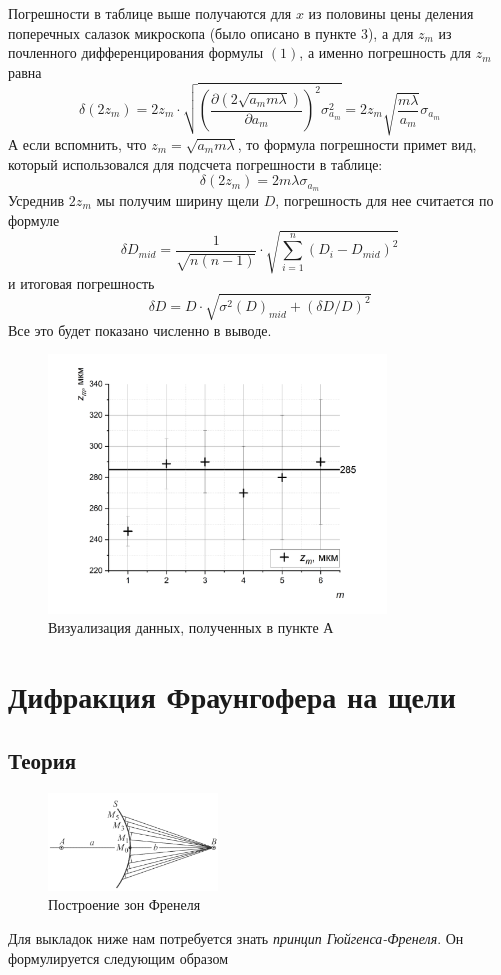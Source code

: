 \documentclass[a4paper, 12pt]{article}%
\begin{document}
\begin{enumerate}
Погрешности в таблице выше получаются для $x$ из половины цены деления поперечных салазок микроскопа (было описано в пункте 3), а для $z_m$ из почленного дифференцирования формулы $(1)$, а именно погрешность для $z_m$ равна 
\[ \delta(2 z_m) = 2	z_m \cdot \sqrt{\left(\dfrac{\partial \left( 2\sqrt{a_mm\lambda} \right)}{\partial a_m}\right)^{2} \sigma_{a_m}^2} = 2 z_m \sqrt{\dfrac{m \lambda}{a_m}} \sigma_{a_m}\]
А если вспомнить, что $z_m = \sqrt{a_m m \lambda}$, то формула погрешности примет вид, который использовался для подсчета погрешности в таблице:
\[\delta(2z_m) = 2 m \lambda \sigma_{a_m}\]
Усреднив $2z_m$ мы получим ширину щели $D$, погрешность для нее считается по формуле 
\[\delta D_{mid} = \dfrac{1}{\sqrt{n(n-1)}} \cdot \sqrt{\sum\limits_{i = 1}^n\left(D_i - D_{mid}\right)^2}\]
и итоговая погрешность 
\[\delta D = D \cdot \sqrt{\sigma^2 (D)_{mid} + (\delta D/D)^2}\]
Все это будет показано численно в выводе.
\begin{figure}[h!]
\begin{center}
\includegraphics[width = 0.8\textwidth]{8.jpg}
\caption{Визуализация данных, полученных в пункте А}
\end{center}
\end{figure}
\end{enumerate}
\section{Дифракция Фраунгофера на щели}
\subsection*{Теория}
\begin{figure}
  \begin{center}
    \includegraphics[width = 0.4\textwidth]{2.png}
  \end{center}
  \caption{Построение зон Френеля}
\end{figure}
Для выкладок ниже нам потребуется знать \textit{принцип Гюйгенса-Френеля}. Он формулируется следующим образом 
\end{document}
